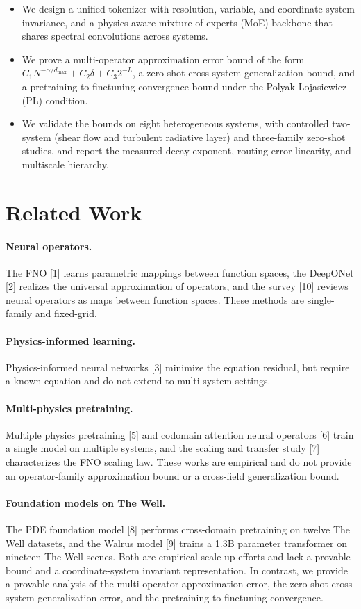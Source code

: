 \documentclass[preprint,12pt]{elsarticle}
\begin{document}
\begin{itemize}
\item We design a unified tokenizer with resolution, variable, and coordinate-system invariance, and a physics-aware mixture of experts (MoE) backbone that shares spectral convolutions across systems.
\item We prove a multi-operator approximation error bound of the form $C_1 N^{-\alpha/d_{\max}} + C_2 \delta + C_3 2^{-L}$, a zero-shot cross-system generalization bound, and a pretraining-to-finetuning convergence bound under the Polyak-Lojasiewicz (PL) condition.
\item We validate the bounds on eight heterogeneous systems, with controlled two-system (shear flow and turbulent radiative layer) and three-family zero-shot studies, and report the measured decay exponent, routing-error linearity, and multiscale hierarchy.
\end{itemize}

\section{Related Work}
\paragraph{Neural operators.} The FNO [1] learns parametric mappings between function spaces, the DeepONet [2] realizes the universal approximation of operators, and the survey [10] reviews neural operators as maps between function spaces. These methods are single-family and fixed-grid.
\paragraph{Physics-informed learning.} Physics-informed neural networks [3] minimize the equation residual, but require a known equation and do not extend to multi-system settings.
\paragraph{Multi-physics pretraining.} Multiple physics pretraining [5] and codomain attention neural operators [6] train a single model on multiple systems, and the scaling and transfer study [7] characterizes the FNO scaling law. These works are empirical and do not provide an operator-family approximation bound or a cross-field generalization bound.
\paragraph{Foundation models on The Well.} The PDE foundation model [8] performs cross-domain pretraining on twelve The Well datasets, and the Walrus model [9] trains a 1.3B parameter transformer on nineteen The Well scenes. Both are empirical scale-up efforts and lack a provable bound and a coordinate-system invariant representation. In contrast, we provide a provable analysis of the multi-operator approximation error, the zero-shot cross-system generalization error, and the pretraining-to-finetuning convergence.
\end{document}
